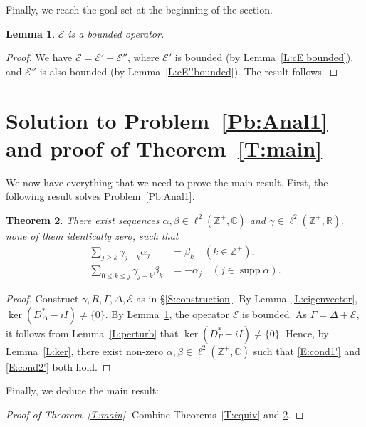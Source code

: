 \documentclass[11pt,reqno]{amsart}
\theoremstyle{plain}
\newtheorem{theorem}{Theorem}[section]
\newtheorem{lemma}[theorem]{Lemma}
\theoremstyle{definition}
\theoremstyle{remark}
\newcommand{\cE}{\mathcal{E}}
\newcommand{\CC}{\mathbb{C}}
\newcommand{\RR}{\mathbb{R}}
\newcommand{\ZZ}{\mathbb{Z}}
\DeclareMathOperator{\supp}{supp}
\begin{document}
Finally, we reach the goal set at the beginning of the section.

\begin{lemma}\label{L:cEbounded}
$\cE$ is a bounded operator.
\end{lemma}

\begin{proof}
We have $\cE=\cE'+\cE''$,
 where $\cE'$ is bounded (by Lemma~\ref{L:cE'bounded}),
 and
 $\cE''$ is also bounded (by Lemma~\ref{L:cE''bounded}). 
The result follows.
\end{proof}



\section{Solution to Problem~\ref{Pb:Anal1} and proof of Theorem~\ref{T:main}}

We now have everything that we need to prove the main result.
First, the following result solves Problem~\ref{Pb:Anal1}.

\begin{theorem}\label{T:soln}
There exist sequences $\alpha,\beta\in\ell^2(\ZZ^+,\CC)$ and $\gamma\in\ell^2(\ZZ^+,\RR)$, none of them identically zero,  such that
\begin{align}
\label{E:cond1'}\sum_{j\ge k}\gamma_{j-k}\alpha_{j}&=\beta_k \quad(k\in\ZZ^+),\\ 
\label{E:cond2'}\sum_{0\le k\le j}\gamma_{j-k}\beta_k&=-\alpha_j  \quad(j\in \supp\alpha).
\end{align}
\end{theorem}

\begin{proof}
Construct $\gamma,R,\Gamma,\Delta,\cE$ as in
\S\ref{S:construction}. 
By Lemma~\ref{L:eigenvector},
$\ker (D_\Delta^*-iI)\ne\{0\}$.
By Lemma~\ref{L:cEbounded},
the operator $\cE$ is bounded.
As $\Gamma=\Delta+\cE$,
it follows from Lemma~\ref{L:perturb}
that $\ker (D_\Gamma^*-iI)\ne\{0\}$.
Hence, by Lemma~\ref{L:ker}, 
there exist non-zero $\alpha,\beta\in\ell^2(\ZZ^+,\CC)$
such that \eqref{E:cond1'} and \eqref{E:cond2'} both hold.
\end{proof}


Finally, we deduce the main result:

\begin{proof}[Proof of Theorem~\ref{T:main}]
Combine Theorems~\ref{T:equiv} and \ref{T:soln}.
\end{proof}
\end{document}
